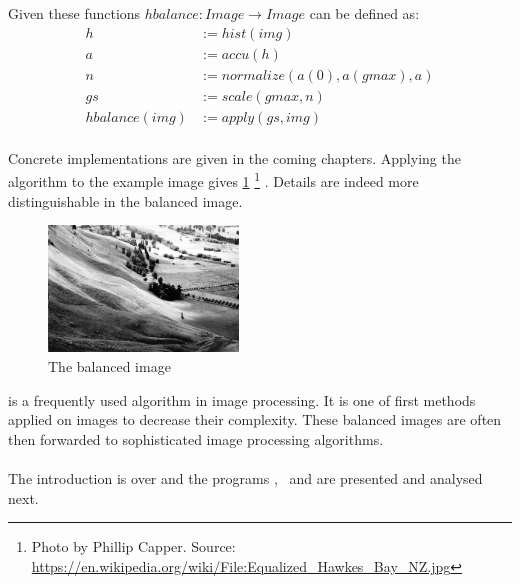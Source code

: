    Given these functions $hbalance: Image \rightarrow Image$ can be defined as:
    \begin{equation*}
    \begin{split}
        h & := hist(img) \\
        a & := accu(h) \\
        n & := normalize(a(0), a(gmax), a) \\
        gs & := scale(gmax,n) \\
      hbalance(img) & := apply(gs,img) \\
    \end{split}
    \end{equation*}
    
    Concrete implementations are given in the coming chapters.
    Applying the algorithm to the example image gives \ref{fig:img-eq}
    \footnote{Photo by Phillip Capper. Source: \url{https://en.wikipedia.org/wiki/File:Equalized_Hawkes_Bay_NZ.jpg}}
    . Details are indeed more distinguishable in the balanced image.
    
    \begin{figure}[h]
      \centering
      \includegraphics[width=0.45\textwidth]{img-eq}
      \caption[Balanced Image]{The balanced image}
      \label{fig:img-eq}
    \end{figure}
    
  \algo{} is a frequently used algorithm in image processing. It is 
  one of first methods applied on images to decrease their complexity.
  These balanced images are often then forwarded to sophisticated
  image processing algorithms.
  
  
  \paragraph{}
    The introduction is over and
    the programs \seq, \man\, \ndpn and \ndpv
    are presented and analysed next.
  
    
